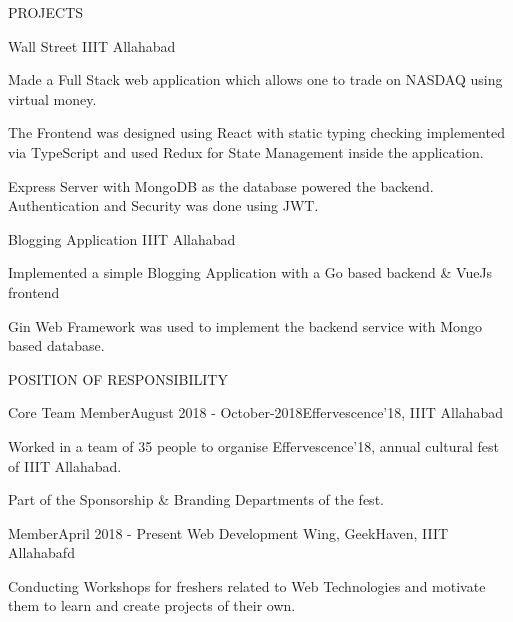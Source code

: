 \documentclass{resume} %
\begin{document}
\begin{rSection}{PROJECTS}


\begin{rSubsection}{Wall Street}
{IIIT Allahabad}{}{}

\vspace{-3pt}

\item Made a Full Stack web application which allows one to trade on NASDAQ using virtual money.
\item The Frontend was designed using React with static typing checking implemented via TypeScript and used Redux for State Management inside the application.
\item Express Server with MongoDB as the database powered the backend. Authentication and Security was done using JWT.

\end{rSubsection}


\begin{rSubsection}{Blogging Application}
{IIIT Allahabad}{}

\vspace{-3pt}

\item Implemented a simple Blogging Application with a Go based backend \& VueJs frontend
\item Gin Web Framework was used to implement the backend service with Mongo based database.
 
\end{rSubsection} 
\end{rSection} 


  
\begin{rSection}{POSITION OF RESPONSIBILITY}

\begin{rSubsection}{Core Team Member}{August 2018 - October-2018}{Effervescence'18, IIIT Allahabad}{}              
\item Worked in a team of 35 people to organise Effervescence'18, annual cultural fest of IIIT Allahabad.
\item Part of the Sponsorship \& Branding Departments of the fest. 
\end{rSubsection}  


\begin{rSubsection}{Member}{April 2018 - Present}
{Web Development Wing, GeekHaven, IIIT Allahabafd}{}
\item Conducting Workshops for freshers related to Web Technologies and motivate them to learn and create projects of their own. 
\end{rSubsection}  

\end{rSection}
\end{document}
